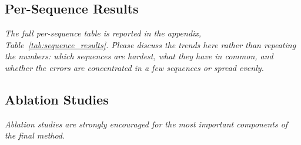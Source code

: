 \documentclass[letterpaper,10pt,conference]{ieeeconf}
\newcommand{\instruction}[1]{\textcolor{instructionblue}{\textit{#1}}}
\begin{document}
\subsection{Per-Sequence Results}

\instruction{The full per-sequence table is reported in the appendix,
Table~\ref{tab:sequence_results}. Please discuss the trends here rather than repeating the numbers:
which sequences are hardest, what they have in common, and whether the errors are concentrated
in a few sequences or spread evenly.}



\subsection{Ablation Studies}

\instruction{
Ablation studies are strongly encouraged for the most important components
of the final method.
}



\end{document}
